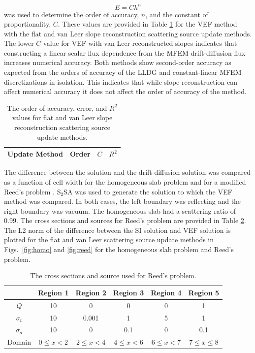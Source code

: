 \begin{equation}
		E = C h^n
	\end{equation}
was used to determine the order of accuracy, $n$, and the constant of proportionality, $C$. These values are provided in Table \ref{tab:mms} for the VEF method with the flat and van Leer slope reconstruction scattering source update methods. 
 The lower $C$ value for VEF with van Leer reconstructed slopes indicates that constructing a linear scalar flux dependence from the MFEM drift-diffusion flux increases numerical accuracy. Both methods show second-order accuracy as expected from the orders of accuracy of the LLDG and constant-linear MFEM discretizations in isolation. This indicates that while slope reconstruction can affect numerical 
 accuracy it does not affect the order of accuracy of the method. 
	\begin{table}[htb]
	\centering
	\begin{tabular}{|c|c|c|c|}
	\hline
	\hline
	Update Method & Order & $C$ & $R^2$ \\ 
	\hline
		
	\hline
	\hline
	\end{tabular}
	\caption{The order of accuracy, error, and $R^2$ values for flat and van Leer slope reconstruction scattering source update methods. }
	\label{tab:mms}
	\end{table}
	
The difference between the \SN solution and the drift-diffusion solution was compared as a function of cell width for the homogeneous slab problem and for a 
modified Reed's problem \cite{reed}. S$_2$SA was used to generate the \SN solution to which the VEF method was compared. In both cases, the left boundary was reflecting and the right boundary was vacuum. The homogeneous slab had a scattering ratio of 0.99. The cross sections and sources for Reed's problem are provided in Table \ref{tab:reedXS}. The L2 norm of the difference between the SI solution and VEF solution is plotted for the flat and van Leer scattering source update methods in Figs.~\ref{fig:homo} and \ref{fig:reed} for the homogeneous slab problem and Reed's problem. 

	\begin{table}[htb]
	 \centering
		\begin{tabular}{|c|c|c|c|c|c|}
			\hline
			& Region 1 & Region 2 & Region 3 & Region 4 & Region 5 \\ 
			\hline 
			$Q$ & 10 & 0 & 0 & 0 & 1 \\ 
			$\sigma_t$ & 10 & 0.001 & 1 & 5 & 1 \\ 
			$\sigma_a$ & 10 & 0 & 0.1 & 0 & 0.1 \\ 
			\hline 
			Domain & $0 \leq x < 2$ & $2 \leq x < 4$ & $4\leq x < 6$ &
				$6 \leq x < 7$ & $7 \leq x \leq 8$\\ 
			\hline 
		\end{tabular}
		\caption{The cross sections and source used for Reed's problem.}
		\label{tab:reedXS}
	\end{table}

